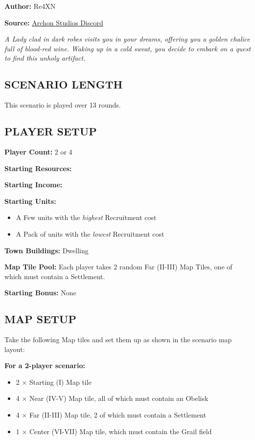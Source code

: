 
\begin{multicols*}{2}

\textbf{Author:} Re4XN

\textbf{Source:} \href{https://discord.com/channels/740870068178649108/1239631918643941509}{Archon Studios Discord}

\textit{A Lady clad in dark robes visits you in your dreams, offering you a golden chalice full of blood-red wine. Waking up in a cold sweat, you decide to embark on a quest to find this unholy artifact.}

\subsection*{\MakeUppercase{Scenario Length}}
This scenario is played over 13 rounds.

\subsection*{\MakeUppercase{Player Setup}}
\textbf{Player Count:} 2 or 4

\textbf{Starting Resources:}\par
{}

\textbf{Starting Income:}\par
{}

\textbf{Starting Units:}
\begin{itemize}
  \item A Few  units with the \textit{highest} Recruitment cost
  \item A Pack of  units with the \textit{lowest} Recruitment cost
\end{itemize}

\textbf{Town Buildings:}  Dwelling

\textbf{Map Tile Pool:} Each player takes 2 random Far (II-III) Map Tiles, one of which must contain a Settlement.

\textbf{Starting Bonus:} None

\subsection*{\MakeUppercase{Map Setup}}
Take the following Map tiles and set them up as shown in the scenario map layout:

\textbf{For a 2-player scenario:}
\begin{itemize}
  \item 2 × Starting (I) Map tile
  \item 4 × Near (IV-V) Map tile, all of which must contain an Obelisk
  \item 4 × Far (II-III) Map tile, 2 of which must contain a Settlement
  \item 1 × Center (VI-VII) Map tile, which must contain the Grail field
\end{itemize}


\end{multicols*}
